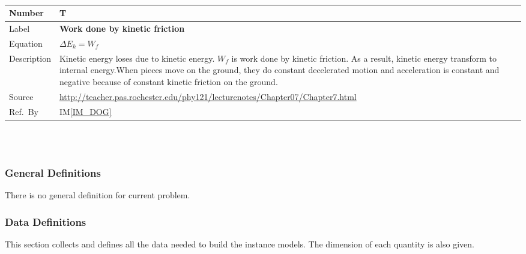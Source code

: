 \documentclass[12pt]{article}
\newcommand{\colAwidth}{0.13\textwidth}
\newcommand{\colBwidth}{0.82\textwidth}
\newcounter{theorynum} %
\newcommand{\iref}[1]{IM\ref{#1}}
\begin{document}
	~\newline
	
	\noindent
	\begin{minipage}{\textwidth}
		\renewcommand*{\arraystretch}{1.5}
		\begin{tabular}{| p{\colAwidth} | p{\colBwidth}|}
			\hline
			\rowcolor[gray]{0.9}
			Number& T{theorynum}\thetheorynum \label{T_WKF}\\
			\hline
			Label&\bf Work done by kinetic friction\\
			\hline
			Equation&  $\Delta E_{k}=W_{f}$\\
			\hline
			
			Description & 
			Kinetic energy loses due to kinetic energy. $W_{f}$ is work done by kinetic friction. As a result, kinetic energy transform to internal energy.When pieces move on the ground, they do constant decelerated motion and acceleration is constant and negative because of constant kinetic friction on the ground.\\
			\hline
			Source &
			\url{http://teacher.pas.rochester.edu/phy121/lecturenotes/Chapter07/Chapter7.html}\\
			\hline
			Ref.\ By & \iref{IM_DOG}\\
			\hline
		\end{tabular}
	\end{minipage}\\
	
	~\newline
	
	\subsubsection{General Definitions}\label{sec_gendef}
	
	There is no general definition for current problem.
	
	\subsubsection{Data Definitions}\label{sec_datadef}
	
	This section collects and defines all the data needed to build the instance
	models. The dimension of each quantity is also given. 
	
	~\newline
	
\end{document}
